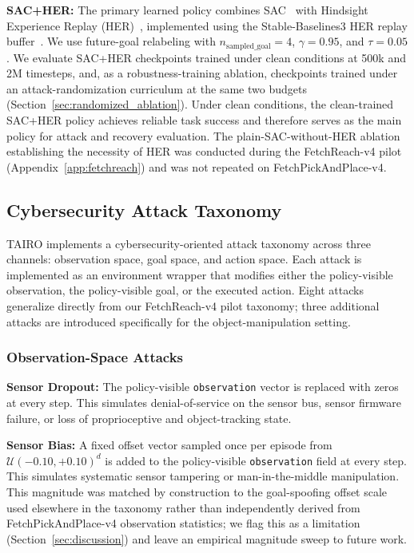 \documentclass[conference]{IEEEtran}
\begin{document}
\textbf{SAC+HER:} The primary learned policy combines SAC~\cite{haarnoja2018soft} with
Hindsight Experience Replay (HER)~\cite{andrychowicz2017hindsight}, implemented using
the Stable-Baselines3 HER replay buffer~\cite{sb3}. We use future-goal relabeling with
$n_{\mathrm{sampled\_goal}}=4$, $\gamma=0.95$, and $\tau=0.05$. We evaluate SAC+HER
checkpoints trained under clean conditions at 500k and 2M timesteps, and, as a
robustness-training ablation, checkpoints trained under an attack-randomization curriculum
at the same two budgets (Section~\ref{sec:randomized_ablation}). Under clean conditions,
the clean-trained SAC+HER policy achieves reliable task success and therefore serves as
the main policy for attack and recovery evaluation. The plain-SAC-without-HER ablation
establishing the necessity of HER was conducted during the FetchReach-v4 pilot
(Appendix~\ref{app:fetchreach}) and was not repeated on FetchPickAndPlace-v4.

\subsection{Cybersecurity Attack Taxonomy}
\label{sec:attacks}

TAIRO implements a cybersecurity-oriented attack taxonomy across three channels:
observation space, goal space, and action space. Each attack is implemented as an
environment wrapper that modifies either the policy-visible observation, the
policy-visible goal, or the executed action. Eight attacks generalize directly from
our FetchReach-v4 pilot taxonomy; three additional attacks are introduced specifically
for the object-manipulation setting.

\subsubsection{Observation-Space Attacks}

\textbf{Sensor Dropout:} The policy-visible \texttt{observation} vector is replaced
with zeros at every step. This simulates denial-of-service on the sensor bus, sensor
firmware failure, or loss of proprioceptive and object-tracking state.

\textbf{Sensor Bias:} A fixed offset vector sampled once per episode from
$\mathcal{U}(-0.10,+0.10)^d$ is added to the policy-visible \texttt{observation}
field at every step. This simulates systematic sensor tampering or man-in-the-middle
manipulation. This magnitude was matched by construction to the goal-spoofing offset
scale used elsewhere in the taxonomy rather than independently derived from
FetchPickAndPlace-v4 observation statistics; we flag this as a limitation
(Section~\ref{sec:discussion}) and leave an empirical magnitude sweep to future work.
\end{document}
